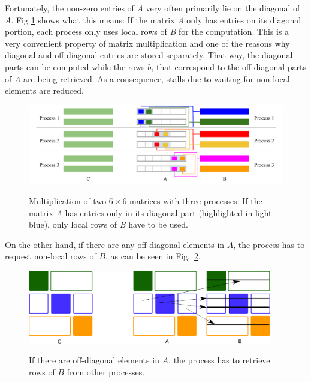 Fortunately, the non-zero entries of \textit{A} very often primarily lie on the diagonal of \textit{A}. Fig \ref{fig:matmult_diagonal} shows what this means: If the matrix \textit{A} only has entries on its diagonal portion, each process only uses local rows of \textit{B} for the computation. This is a very convenient property of matrix multiplication and one of the reasons why diagonal and off-diagonal entries are stored separately. That way, the diagonal parts can be computed while the rows $b_i$ that correspond to the off-diagonal parts of \textit{A} are being retrieved. As a consequence, stalls due to waiting for non-local elements are reduced. 

\begin{figure}[tb]
\centering
{\includegraphics[width=1.05\textwidth]{matrix_multiplication_diagonal}}
\caption{Multiplication of two $6\times 6$ matrices with three processes: If the matrix \textit{A} has entries only in its diagonal part (highlighted in light blue), only local rows of \textit{B} have to be used.}
\label{fig:matmult_diagonal}
\end{figure}

On the other hand, if there are any off-diagonal elements in $A$, the process has to request non-local rows of $B$, as can be seen in Fig.~\ref{fig:parallel-2}. 


\begin{figure}[tb]
\centering
\vspace{5mm}
{\includegraphics[width=0.95\textwidth]{parallel/spgemm-parallel-2}}
\caption{If there are off-diagonal elements in $A$, the process has to retrieve rows of $B$ from other processes.}
\label{fig:parallel-2}
\end{figure}



